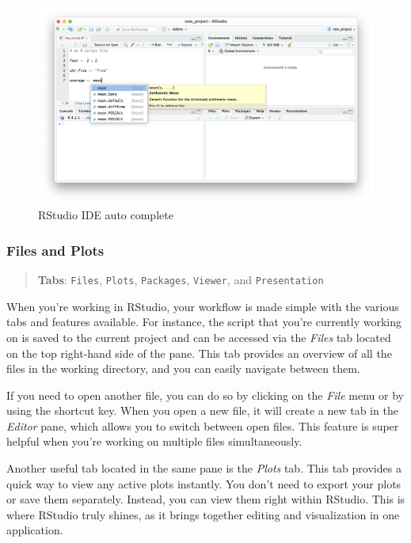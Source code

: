 \documentclass[
]{book}
\begin{document}
\begin{figure}
\includegraphics[width=31.94in]{images/02_023_editor_autocomplete} \caption{\label{fig:2023}RStudio IDE auto complete}\label{fig:2023}
\end{figure}

\hypertarget{files-and-plots}{%
\subsubsection*{Files and Plots}\label{files-and-plots}}

\begin{quote}
\textbf{Tabs}: \texttt{Files}, \texttt{Plots}, \texttt{Packages}, \texttt{Viewer}, and \texttt{Presentation}
\end{quote}

When you're working in RStudio, your workflow is made simple with the various tabs and features available. For instance, the script that you're currently working on is saved to the current project and can be accessed via the \emph{Files} tab located on the top right-hand side of the pane. This tab provides an overview of all the files in the working directory, and you can easily navigate between them.

If you need to open another file, you can do so by clicking on the \emph{File} menu or by using the shortcut key. When you open a new file, it will create a new tab in the \emph{Editor} pane, which allows you to switch between open files. This feature is super helpful when you're working on multiple files simultaneously.

Another useful tab located in the same pane is the \emph{Plots} tab. This tab provides a quick way to view any active plots instantly. You don't need to export your plots or save them separately. Instead, you can view them right within RStudio. This is where RStudio truly shines, as it brings together editing and visualization in one application.
\end{document}
